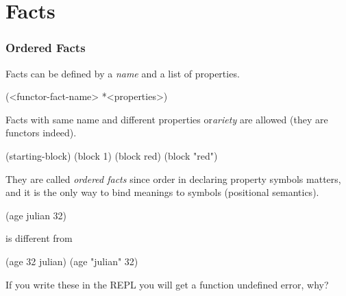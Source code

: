 \documentclass[xcolor={usenames,dvipsnames,svgnames}, compress]{beamer}
\begin{document}
\section{Facts}
{
  \begin{frame}
    \sectionpage
  \end{frame}
}

\begin{frame}[fragile]
  \frametitle{Ordered Facts}

  Facts can be defined by a \emph{name} and a list of properties.
  \begin{clips-code}[numbers=none]
    (<functor-fact-name> *<properties>)
  \end{clips-code}
  Facts with same name and different properties or\emph{ariety} are allowed (they
  are functors indeed).
  \begin{clips-code}[numbers=none]
    (starting-block)    (block 1)    (block red)   (block  "red")
  \end{clips-code}
  They are called \emph{ordered facts} since order in declaring property
  symbols matters, and it is the only way to bind meanings to symbols (positional semantics).
  \begin{clips-code}[numbers=none]
    (age julian 32)
  \end{clips-code}
  is different from
  \begin{clips-code}[numbers=none]
    (age 32 julian)    (age "julian" 32)
  \end{clips-code}
  If you write these in the REPL you will get a function undefined
  error, why?
\end{frame}
\end{document}
